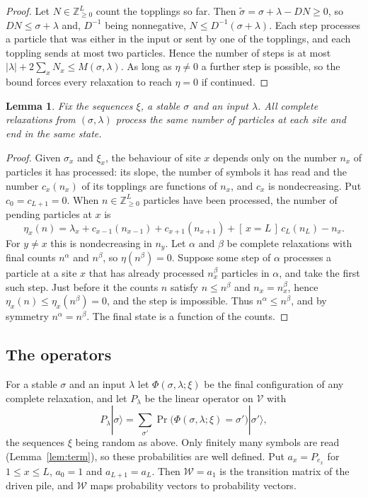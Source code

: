 \documentclass[11pt]{amsart}
\newtheorem{lemma}[theorem]{Lemma}
\theoremstyle{definition}
\theoremstyle{remark}
\newcommand{\Z}{\mathbb{Z}}
\newcommand{\cV}{\mathcal{V}}
\newcommand{\cW}{\mathcal{W}}
\newcommand{\ket}[1]{|#1\rangle}
\newcommand{\Ind}[1]{[\,#1\,]}
\begin{document}
\begin{proof}
Let $N\in\Z_{\ge0}^L$ count the topplings so far. Then $\tilde\sigma=\sigma+\lambda-DN\ge0$, so $DN\le\sigma+\lambda$ and, $D^{-1}$ being nonnegative, $N\le D^{-1}(\sigma+\lambda)$. Each step processes a particle that was either in the input or sent by one of the topplings, and each toppling sends at most two particles. Hence the number of steps is at most $|\lambda|+2\sum_xN_x\le M(\sigma,\lambda)$. As long as $\eta\ne0$ a further step is possible, so the bound forces every relaxation to reach $\eta=0$ if continued.
\end{proof}

\begin{lemma}\label{lem:unique}
Fix the sequences $\xi$, a stable $\sigma$ and an input $\lambda$. All complete relaxations from $(\sigma,\lambda)$ process the same number of particles at each site and end in the same state.
\end{lemma}

\begin{proof}
Given $\sigma_x$ and $\xi_x$, the behaviour of site $x$ depends only on the number $n_x$ of particles it has processed: its slope, the number of symbols it has read and the number $c_x(n_x)$ of its topplings are functions of $n_x$, and $c_x$ is nondecreasing. Put $c_0=c_{L+1}=0$. When $n\in\Z_{\ge0}^L$ particles have been processed, the number of pending particles at $x$ is
\[
\eta_x(n)=\lambda_x+c_{x-1}(n_{x-1})+c_{x+1}(n_{x+1})+\Ind{x=L}\,c_L(n_L)-n_x .
\]
For $y\ne x$ this is nondecreasing in $n_y$. Let $\alpha$ and $\beta$ be complete relaxations with final counts $n^\alpha$ and $n^\beta$, so $\eta(n^\beta)=0$. Suppose some step of $\alpha$ processes a particle at a site $x$ that has already processed $n^\beta_x$ particles in $\alpha$, and take the first such step. Just before it the counts $n$ satisfy $n\le n^\beta$ and $n_x=n^\beta_x$, hence $\eta_x(n)\le\eta_x(n^\beta)=0$, and the step is impossible. Thus $n^\alpha\le n^\beta$, and by symmetry $n^\alpha=n^\beta$. The final state is a function of the counts.
\end{proof}

\subsection{The operators}
For a stable $\sigma$ and an input $\lambda$ let $\Phi(\sigma,\lambda;\xi)$ be the final configuration of any complete relaxation, and let $P_\lambda$ be the linear operator on $\cV$ with
\[
P_\lambda\ket{\sigma}=\sum_{\sigma'}\Pr\bigl(\Phi(\sigma,\lambda;\xi)=\sigma'\bigr)\ket{\sigma'} ,
\]
the sequences $\xi$ being random as above. Only finitely many symbols are read (Lemma~\ref{lem:term}), so these probabilities are well defined. Put $a_x=P_{e_x}$ for $1\le x\le L$, $a_0=1$ and $a_{L+1}=a_L$. Then $\cW=a_1$ is the transition matrix of the driven pile, and $\cW$ maps probability vectors to probability vectors.
\end{document}
